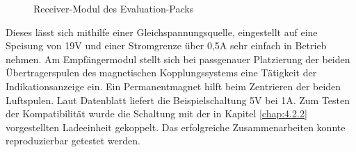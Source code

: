 \documentclass[12pt]{scrreprt} %
\begin{document}
\begin{figure}
\centering
{}
\caption{Receiver-Modul des Evaluation-Packs}
\label{BQ_rec}
\end{figure}
Dieses lässt sich mithilfe einer Gleichspannungsquelle, eingestellt auf eine Speisung von 19V und einer Stromgrenze über 0,5A sehr einfach in Betrieb nehmen. Am Empfängermodul stellt sich bei passgenauer Platzierung der beiden Übertragerspulen des magnetischen Kopplungssystems eine Tätigkeit der Indikationsanzeige ein. Ein Permanentmagnet hilft beim Zentrieren der beiden Luftspulen. Laut Datenblatt \citep[vgl. S.2]{bq51013EVM-725} liefert die Beispielschaltung 5V bei 1A. Zum Testen der Kompatibilität wurde die Schaltung mit der in Kapitel \ref{chap:4.2.2} vorgestellten Ladeeinheit gekoppelt. Das erfolgreiche Zusammenarbeiten konnte reproduzierbar getestet werden.\\
\end{document}
